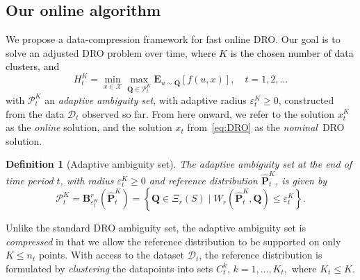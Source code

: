 \documentclass[12pt]{article}
\newcommand{\bnote}[1]{\textcolor{purple}{\textbf{[B: #1]}}}
\newcommand{\supp}{S}
\newcommand{\unc}{u}
\newcommand{\eps}{\varepsilon^K}
\newcommand{\epsnom}{\varepsilon}
\newtheorem{definition}{Definition}[section]
\newcommand{\RC}[1]{\textcolor{black}{#1}}
\newcommand{\RC}[1]{\textcolor{blue}{#1}}
\begin{document}

\subsection{Our online algorithm}
\label{subsec:ours}
We propose a data-compression framework for fast online \gls{DRO}. 
Our goal is to solve an adjusted \gls{DRO} problem over time, \RC{where $K$ is the chosen number of data clusters, and}
\begin{equation}\label{eq:dro:time}
H^K_t = \min_{x \in \mathcal{X}} \max_{\mathbf{Q} \in \mathcal{P}^K_{t}}\mathbf{E}_{\unc \sim \mathbf{Q}}[f(\unc,x)],\quad t=1,2,\dots
\end{equation}
with $\mathcal{P}^K_{t}$ an {\it adaptive ambiguity set}, with adaptive radius $\eps_{t} \geq 0$, constructed from the data $\mathcal{D}_{t}$ observed so far. 
From here onward, we refer to the solution $x^K_t$ as the {\it online} solution, and the solution $x_t$ from~\eqref{eq:DRO} as the {\it nominal}~\gls{DRO} solution.
\begin{definition}[Adaptive ambiguity set]
The adaptive ambiguity set at the end of time period $t$, with radius $\eps_{t}\geq0$ and reference distribution $\hat{\mathbf{P}}^K_{t}$, is given by
\begin{equation}\label{empirical:ball_t}
\mathcal{P}^K_t = \mathbf{B}_{\eps_{t}}^r(\hat{\mathbf{P}}^K_{t})=\left\{\mathbf{Q} \in \Xi_r({\supp}) \mid W_r(\hat{\mathbf{P}}^K_{t}, \mathbf{Q}) \leq \eps_{t}\right\}.
\end{equation}
\end{definition}
Unlike the standard \gls{DRO} ambiguity set, the adaptive ambiguity set is {\it compressed} in that we allow the reference distribution to be supported on only $K \leq n_t$ points.
With access to the dataset $\mathcal{D}_t$, the reference distribution is formulated by {\it clustering} the datapoints into sets $C^k_t$, $k = 1, \dots,K_t,$ where $K_t \leq K$.
\end{document}
